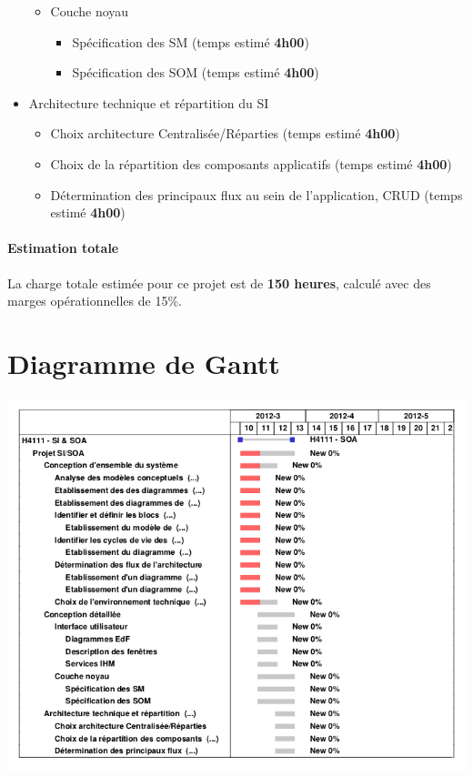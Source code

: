 \begin{itemize}
\begin{itemize}
\item Couche noyau

\begin{itemize}
\item Spécification des SM (temps estimé \textbf{4h00})
\item Spécification des SOM (temps estimé \textbf{4h00})
\end{itemize}

\end{itemize}

\item Architecture technique et répartition du SI

\begin{itemize}
\item Choix architecture Centralisée/Réparties (temps estimé \textbf{4h00})
\item Choix de la répartition des composants applicatifs (temps estimé \textbf{4h00})
\item Détermination des principaux flux au sein de l'application, CRUD (temps estimé \textbf{4h00})
\end{itemize}

\end{itemize}

\paragraph{Estimation totale} La charge totale estimée pour ce projet est de \textbf{150 heures}, calculé avec des marges opérationnelles de 15\%.

\section{Diagramme de Gantt}

\begin {center}
\includegraphics[width=\textwidth]{gantt.png}
\end {center}
